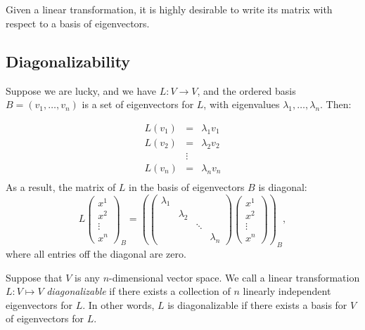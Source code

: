 \chapter{\diagTitle}\label{sec:diagonalization}



Given a linear transformation, it is highly desirable to write its matrix  with respect to a basis of eigenvectors.

\section{Diagonalizability}

Suppose we are lucky, and we have $L \colon V\to V$, and the ordered basis 
$B=(v_1, \ldots, v_n )$ is a set of %
eigenvectors for $L$, with eigenvalues $\lambda_1, \ldots, \lambda_n$.  Then:

\begin{eqnarray*}
L(v_1)&=&\lambda_1 v_1 \\
L(v_2)&=&\lambda_2 v_2 \\
&\vdots & \\
L(v_n)&=&\lambda_n v_n \\
\end{eqnarray*}
As a result, the matrix of $L$ in the basis of eigenvectors $B$ is diagonal:
\[
L\begin{pmatrix}
x^1\\
x^2\\
\vdots\\
x^n
\end{pmatrix}_B
=
\left(
\begin{pmatrix}
\lambda_1    \\
& \lambda_2 &  & \\
&  & \ddots &  \\
& & & \lambda_n
\end{pmatrix}
\begin{pmatrix}
x^1\\
x^2\\
\vdots\\
x^n
\end{pmatrix}
\right)_B
,
\]
where all entries off the diagonal are zero.

Suppose that \(V\) is any \(n\)-dimensional vector space. We call a linear transformation $L \colon V\mapsto V$ \emph{diagonalizable} if there exists a collection of $n$ linearly independent eigenvectors for $L$.  In other words, $L$ is diagonalizable if there exists a basis for $V$ of eigenvectors for $L$.  

